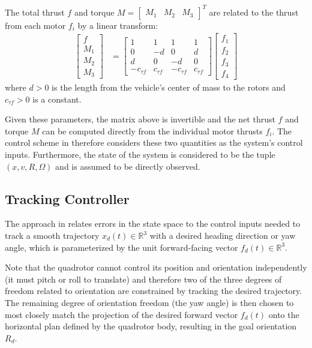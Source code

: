 \documentclass[paper=letter, fontsize=11pt]{scrartcl} %
\numberwithin{equation}{section} %
\numberwithin{figure}{section} %
\numberwithin{table}{section} %
\begin{document}
The total thrust $f$ and torque $M = \begin{bmatrix} M_1 & M_2 & M_3\end{bmatrix}^T$
are related to the thrust from each motor $f_i$ by a linear transform:
\begin{align}
  \begin{bmatrix}
    f \\
    M_1 \\
    M_2 \\
    M_3
  \end{bmatrix}
  &=
  \begin{bmatrix}
    1 & 1 & 1 & 1\\
    0 & -d & 0 & d \\
    d & 0 & -d & 0 \\
    -c_{\tau f} & c_{\tau f} & -c_{\tau f} & c_{\tau f}
  \end{bmatrix}
  \begin{bmatrix}
    f_1 \\
    f_2 \\
    f_3 \\
    f_4
  \end{bmatrix}
\end{align}
where $d > 0$ is the length from the vehicle's center of mass to the rotors and
$c_{\tau f} > 0$ is a constant.

Given these parameters, the matrix above is invertible and the net thrust $f$ and
torque $M$ can be computed directly from the individual motor thrusts $f_i$.
The control scheme in \cite{lee2010geometric} therefore considers these two
quantities as the system's control inputs. Furthermore, the state of the system is considered
to be the tuple $(x, v, R, \Omega)$ and is assumed to be directly observed.

\subsection{Tracking Controller}
The approach in \cite{lee2010geometric} relates errors in the state space to the
control inputs needed to track a smooth trajectory $x_d(t) \in \mathbb{R}^3$ with
a desired heading direction or yaw angle, which is parameterized by the unit forward-facing
vector $f_d(t) \in \mathbb{R}^3$.

Note that the quadrotor cannot control its
position and orientation independently (it must pitch or roll to translate) and
therefore two of the three degrees of freedom related to orientation are constrained
by tracking the desired trajectory. The remaining degree of orientation freedom
(the yaw angle) is then chosen to most closely match the projection of the
desired forward vector $f_d(t)$ onto the horizontal plan defined by the quadrotor
body, resulting in the goal orientation $R_d$.
\end{document}
